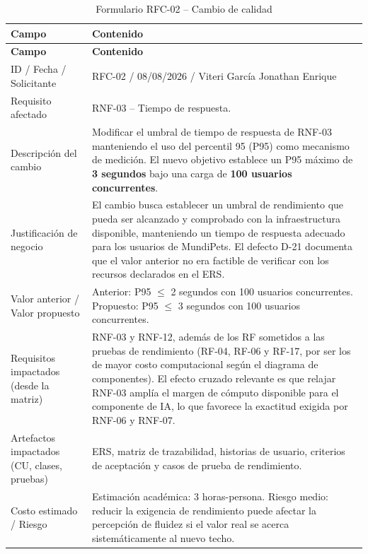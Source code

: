 \documentclass[journal,onecolumn]{IEEEtran}
\begin{document}
	\begin{longtable}{L{4.0cm} L{9.5cm}}
		\caption{Formulario RFC-02 -- Cambio de calidad}\label{tab:rfc02}\\
		\toprule
		\textbf{Campo} & \textbf{Contenido} \\
		\midrule
		\endfirsthead
		\toprule
		\textbf{Campo} & \textbf{Contenido} \\
		\midrule
		\endhead
		\bottomrule
		\endfoot
		ID / Fecha / Solicitante &
		RFC-02 / 08/08/2026 / Viteri García Jonathan Enrique \\
		\addlinespace
		Requisito afectado & RNF-03 -- Tiempo de respuesta. \\
		\addlinespace
		Descripción del cambio &
		Modificar el umbral de tiempo de respuesta de RNF-03 manteniendo el uso del percentil 95 (P95)
		como mecanismo de medición. El nuevo objetivo establece un P95 máximo de \textbf{3 segundos}
		bajo una carga de \textbf{100 usuarios concurrentes}. \\
		\addlinespace
		Justificación de negocio &
		El cambio busca establecer un umbral de rendimiento que pueda ser alcanzado y comprobado con
		la infraestructura disponible, manteniendo un tiempo de respuesta adecuado para los usuarios
		de MundiPets. El defecto D-21 documenta que el valor anterior no era factible de verificar con
		los recursos declarados en el ERS. \\
		\addlinespace
		Valor anterior / Valor propuesto &
		Anterior: P95 $\leq$ 2 segundos con 100 usuarios concurrentes.
		Propuesto: P95 $\leq$ 3 segundos con 100 usuarios concurrentes. \\
		\addlinespace
		Requisitos impactados (desde la matriz) &
		RNF-03 y RNF-12, además de los RF sometidos a las pruebas de rendimiento (RF-04, RF-06 y
		RF-17, por ser los de mayor costo computacional según el diagrama de componentes). El efecto
		cruzado relevante es que relajar RNF-03 amplía el margen de cómputo disponible para el
		componente de IA, lo que favorece la exactitud exigida por RNF-06 y RNF-07. \\
		\addlinespace
		Artefactos impactados (CU, clases, pruebas) &
		ERS, matriz de trazabilidad, historias de usuario, criterios de aceptación y casos de prueba
		de rendimiento. \\
		\addlinespace
		Costo estimado / Riesgo &
		Estimación académica: 3 horas-persona. Riesgo medio: reducir la exigencia de rendimiento puede
		afectar la percepción de fluidez si el valor real se acerca sistemáticamente al nuevo techo.
		\\

\end{longtable}
\end{document}
